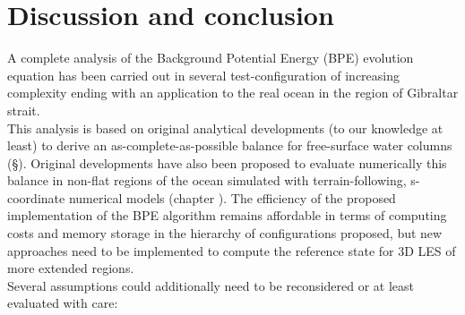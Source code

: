 \section{Discussion and conclusion}
A complete analysis of the Background Potential Energy (BPE) evolution equation has been carried out in several test-configuration of increasing complexity ending with an application to the real ocean in the region of Gibraltar strait.\\
This analysis is based on original analytical developments (to our knowledge at least) to derive an as-complete-as-possible balance for free-surface water columns (\S  {}). Original developments have also been proposed to evaluate numerically this balance in non-flat regions of the ocean simulated with terrain-following, s-coordinate numerical models (chapter ). The efficiency of the proposed implementation of the BPE algorithm remains affordable in terms of computing costs and memory storage in the hierarchy of configurations proposed, but new approaches need to be implemented to compute the reference state \cite{saenz_estimating_2015} for 3D LES of more extended regions.\\
Several assumptions could additionally need to be reconsidered or at least evaluated with care:
